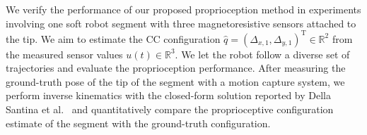
We verify the performance of our proposed proprioception method in experiments involving one soft robot segment with three magnetoresistive sensors attached to the tip.
We aim to estimate the CC configuration $\hat{q} = (\Delta_{x,1}, \Delta_{y,1})^\mathrm{T} \in \mathbb{R}^2$ from the measured sensor values $u(t) \in \mathbb{R}^3$.
We let the robot follow a diverse set of trajectories and evaluate the proprioception performance.
After measuring the ground-truth pose of the tip of the segment with a motion capture system, we perform inverse kinematics with the closed-form solution reported by Della Santina et al.~\cite{della2020improved} and quantitatively compare the proprioceptive configuration estimate of the segment with the ground-truth configuration.

